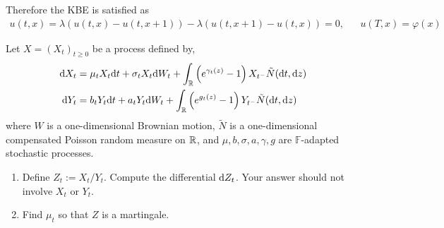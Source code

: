 \documentclass[10pt]{article}
\begin{document}
\begin{solution}[Solution]
\begin{enumerate}[label=(\alph*)]
        Therefore the KBE is satisfied as
        \begin{align*}
            [\partial_t+\mathcal{A}] u(t,x)
            = \lambda(u(t,x) - u(t,x+1)) - \lambda(u(t,x+1)-u(t,x)) = 0,
            && 
            u(T,x) = \varphi(x) 
        \end{align*}
         
\end{enumerate}
\end{solution}

\begin{problem}[Exercise 10.2]

\end{problem}

\begin{solution}[Solution]
    
\end{solution}



\begin{problem}[Exercise 10.3]
    Let \( X = (X_t)_{t\geq 0} \) be a process defined by,
    \begin{align*}
        \mathrm{d} X_t &= \mu_t X_t \mathrm{d} t + \sigma_t X_t \mathrm{d} W_t + \int_{\mathbb{R}} \left( e^{\gamma_t(z)}-1 \right)X_{t^-} \tilde{N}(\mathrm{d} t, \mathrm{d} z) \\
        \mathrm{d} Y_t &= b_t Y_t \mathrm{d} t + a_t Y_t \mathrm{d} W_t + \int_{\mathbb{R}} \left( e^{g_t(z)}-1 \right)Y_{t^-}\tilde{N}(\mathrm{d} t,\mathrm{d} z)
    \end{align*} 
    where \( W \) is a one-dimensional Brownian motion, \( \tilde{N} \) is a one-dimensional compensated Poisson random measure on \( \mathbb{R} \), and \( \mu,b,\sigma,a,\gamma, g\) are \( \mathbb{F} \)-adapted stochastic processes.
    \begin{enumerate}[label=(\alph*)]
        \item Define \( Z_t:=X_t/Y_t \). Compute the differential \( \mathrm{d} Z_t \). Your answer should not involve \( X_t \) or \( Y_t \).
        \item Find \( \mu_t \) so that \( Z \) is a martingale.
    \end{enumerate}
\end{problem}
\end{document}
